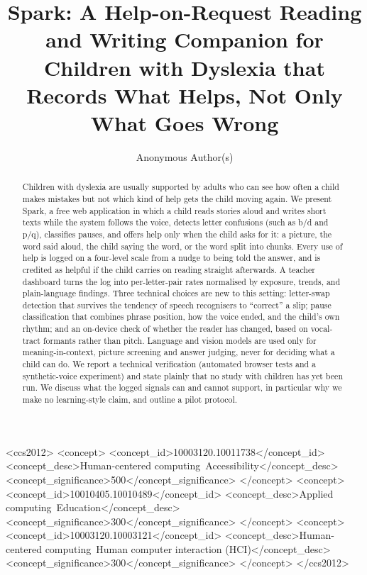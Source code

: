 \documentclass[manuscript, screen, review, anonymous]{acmart}
\begin{document}
\title{Spark: A Help-on-Request Reading and Writing Companion for Children with Dyslexia that Records What Helps, Not Only What Goes Wrong}

\author{Anonymous Author(s)}

\begin{abstract}
Children with dyslexia are usually supported by adults who can see how often a child makes mistakes but not which kind of help gets the child moving again. We present Spark, a free web application in which a child reads stories aloud and writes short texts while the system follows the voice, detects letter confusions (such as b/d and p/q), classifies pauses, and offers help only when the child asks for it: a picture, the word said aloud, the child saying the word, or the word split into chunks. Every use of help is logged on a four-level scale from a nudge to being told the answer, and is credited as helpful if the child carries on reading straight afterwards. A teacher dashboard turns the log into per-letter-pair rates normalised by exposure, trends, and plain-language findings. Three technical choices are new to this setting: letter-swap detection that survives the tendency of speech recognisers to ``correct'' a slip; pause classification that combines phrase position, how the voice ended, and the child's own rhythm; and an on-device check of whether the reader has changed, based on vocal-tract formants rather than pitch. Language and vision models are used only for meaning-in-context, picture screening and answer judging, never for deciding what a child can do. We report a technical verification (automated browser tests and a synthetic-voice experiment) and state plainly that no study with children has yet been run. We discuss what the logged signals can and cannot support, in particular why we make no learning-style claim, and outline a pilot protocol.
\end{abstract}

\begin{CCSXML}
<ccs2012>
<concept>
<concept_id>10003120.10011738</concept_id>
<concept_desc>Human-centered computing~Accessibility</concept_desc>
<concept_significance>500</concept_significance>
</concept>
<concept>
<concept_id>10010405.10010489</concept_id>
<concept_desc>Applied computing~Education</concept_desc>
<concept_significance>300</concept_significance>
</concept>
<concept>
<concept_id>10003120.10003121</concept_id>
<concept_desc>Human-centered computing~Human computer interaction (HCI)</concept_desc>
<concept_significance>300</concept_significance>
</concept>
</ccs2012>
\end{CCSXML}
\end{document}
